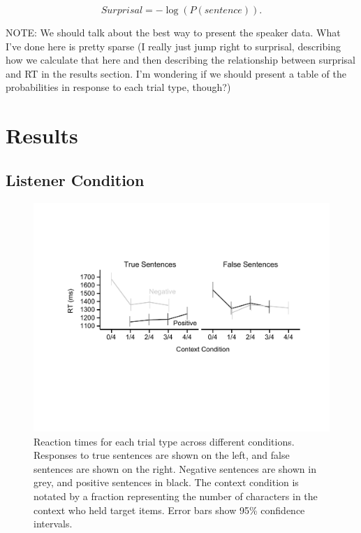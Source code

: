 \documentclass[man]{apa2}
\begin{document}
\begin{equation}\label{eq:surprise}
Surprisal = -\log(P(sentence)).
\end{equation}

NOTE: We should talk about the best way to present the speaker data.  What I've done here is pretty sparse (I really just jump right to surprisal, describing how we calculate that here and then describing the relationship between surprisal and RT in the results section.  I'm wondering if we should present a table of the probabilities in response to each trial type, though?)

\section{Results}

\subsection{Listener Condition}

\begin{figure}[t]
\begin{center} 
\includegraphics[width=6in]{figures/rts.pdf}
\caption{\label{fig:e2line} Reaction times for each trial type across different conditions. Responses to true sentences are shown on the left, and false sentences are shown on the right.  Negative sentences are shown in grey, and positive sentences in black.  The context condition is notated by a fraction representing the number of characters in the context who held target items. Error bars show 95\% confidence intervals.  }
\end{center} 
\end{figure}
\end{document}
